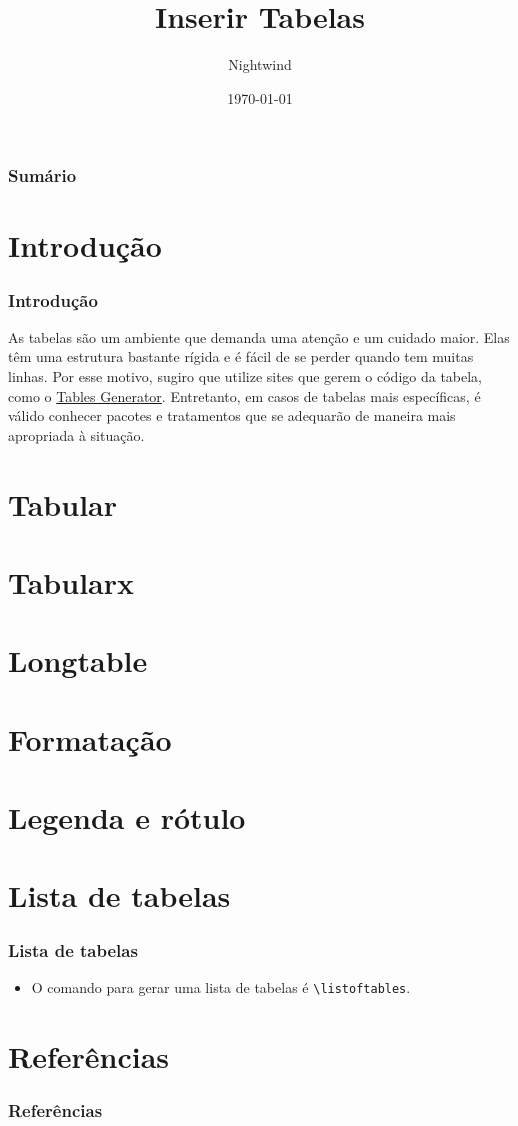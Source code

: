 \documentclass{beamer}
\title{Inserir Tabelas}
\author{Nightwind}
\institute[CTISM]{Colégio Técnico Industrial de Santa Maria}
\date{\today}
\begin{document}
\frame{\titlepage}

\begin{frame}
  \frametitle{Sumário}
  \tableofcontents
\end{frame}

\section{Introdução}
\begin{frame}
  \frametitle{Introdução}

  As tabelas são um ambiente que demanda uma atenção e um cuidado maior. Elas têm uma estrutura bastante rígida e é fácil de se perder quando tem muitas linhas. Por esse motivo, sugiro que utilize sites que gerem o código da tabela, como o \href{https://www.tablesgenerator.com/}{Tables Generator}. Entretanto, em casos de tabelas mais específicas, é válido conhecer pacotes e tratamentos que se adequarão de maneira mais apropriada à situação.

\end{frame}

\section{Tabular}


\section{Tabularx}

\section{Longtable}

\section{Formatação}

\section{Legenda e rótulo}

\section{Lista de tabelas}
\begin{frame}[fragile]
  \frametitle{Lista de tabelas}

  \begin{itemize}
    \item O comando para gerar uma lista de tabelas é \lstinline[style=myStyleLatex]!\listoftables!.
  \end{itemize}

\end{frame}

\section{Referências}
\begin{frame}[allowframebreaks]
  \frametitle{Referências}
  \nocite{*}
  \printbibliography[keyword={inserirTabela}]
\end{frame}
\end{document}
